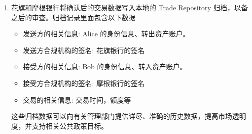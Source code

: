\begin{enumerate}
    \item 花旗和摩根银行将确认后的交易数据写入本地的 Trade Repository 归档，以备之后的审查。归档记录里面包含以下数据
        \begin{itemize}
            \item   发送方的相关信息: Alice 的身份信息、转出资产账户。
            \item   发送方合规机构的签名: 花旗银行的签名
            \item   接受方的相关信息: Bob 的身份信息、转入资产账户。
            \item   接受方合规机构的签名: 摩根银行的签名
            \item   交易的相关信息: 交易时间，额度等
        \end{itemize}
        这些归档数据可以向有关管理部门提供详尽、准确的历史数据，提高市场透明度，并支持相关公共政策目标。
\end{enumerate}

